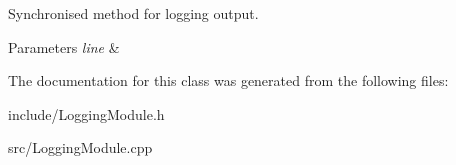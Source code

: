 Synchronised method for logging output. 


\begin{DoxyParams}{Parameters}
{\em line} & \\
\hline
\end{DoxyParams}


The documentation for this class was generated from the following files\+:\begin{DoxyCompactItemize}
\item 
include/Logging\+Module.\+h\item 
src/Logging\+Module.\+cpp\end{DoxyCompactItemize}
